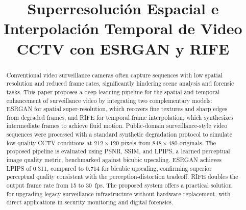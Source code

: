 \documentclass[conference]{IEEEtran}
\begin{document}
\title{Superresolución Espacial e Interpolación Temporal de Video CCTV con ESRGAN y RIFE}

\author{
  \and
  \and
}

\maketitle

\begin{abstract}
Conventional video surveillance cameras often capture sequences with low spatial resolution and reduced frame rates, significantly hindering scene analysis and forensic tasks. This paper proposes a deep learning pipeline for the spatial and temporal enhancement of surveillance video by integrating two complementary models: ESRGAN for spatial super-resolution, which recovers fine textures and sharp edges from degraded frames, and RIFE for temporal frame interpolation, which synthesizes intermediate frames to achieve fluid motion. Public-domain surveillance-style video sequences were processed with a standard synthetic degradation protocol to simulate low-quality CCTV conditions at $212\times120$ pixels from $848\times480$ originals. The proposed pipeline is evaluated using PSNR, SSIM, and LPIPS, a learned perceptual image quality metric, benchmarked against bicubic upscaling. ESRGAN achieves LPIPS of 0.311, compared to 0.714 for bicubic upscaling, confirming superior perceptual quality consistent with the perception-distortion tradeoff. RIFE doubles the output frame rate from 15 to 30~fps. The proposed system offers a practical solution for upgrading legacy surveillance infrastructure without hardware replacement, with direct applications in security monitoring and digital forensics.
\end{abstract}
\end{document}

